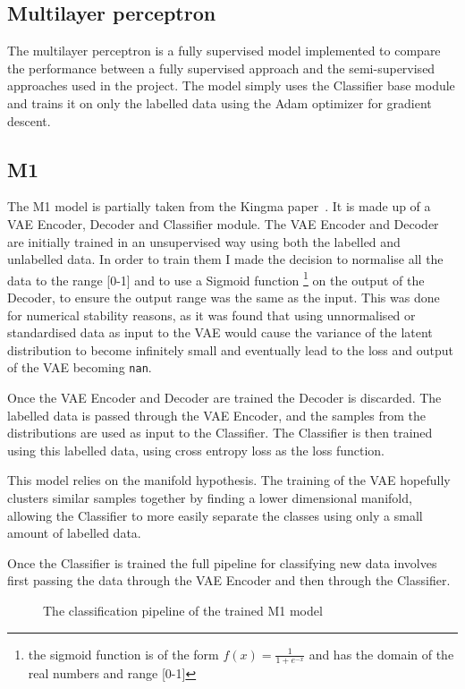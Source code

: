\documentclass[12pt,a4paper,twoside,openright]{report}
\begin{document}
\subsection{Multilayer perceptron}
The multilayer perceptron is a fully supervised model implemented to compare the performance between a fully supervised approach and the 
semi-supervised approaches used in the project. The model simply uses the Classifier base module and trains it on only the labelled data 
using the Adam optimizer for gradient descent.

\subsection{M1}
The M1 model is partially taken from the Kingma paper~\cite{DBLP:journals/corr/KingmaRMW14}. It is made up of a VAE Encoder,
Decoder and Classifier 
module. The VAE Encoder and Decoder are initially trained in an unsupervised way using both the labelled and unlabelled data. In order 
to train them I made the decision to normalise all the data to the range [0-1] and to use a Sigmoid function 
\footnote{the sigmoid function is of
the form $f(x) = \frac{1}{1+e^{-x}}$ and has the domain of the real numbers and range [0-1]} on the output of the Decoder, to ensure the output range 
was the same as the input. This was done for numerical stability reasons, as it was found that using unnormalised or standardised data 
as input to the VAE would cause the variance of the latent distribution to become infinitely small and eventually lead to the loss and 
output of the VAE becoming \texttt{nan}.

Once the VAE Encoder and Decoder are trained the Decoder is discarded. The labelled data is passed through the VAE Encoder, and the samples
from the distributions are used as input to the Classifier. The Classifier is then trained using this labelled data, using cross entropy 
loss as the loss function. 

This model relies on the manifold hypothesis. The training of the VAE hopefully clusters similar samples together by finding a lower
dimensional manifold, allowing the Classifier to more easily separate the classes using only a small amount of labelled data.

Once the Classifier is trained the full pipeline for classifying new data involves first passing the data 
through the VAE Encoder and then through the Classifier.

\begin{figure}[H]
  \centering
  \caption{The classification pipeline of the trained M1 model}
\end{figure}
\end{document}
